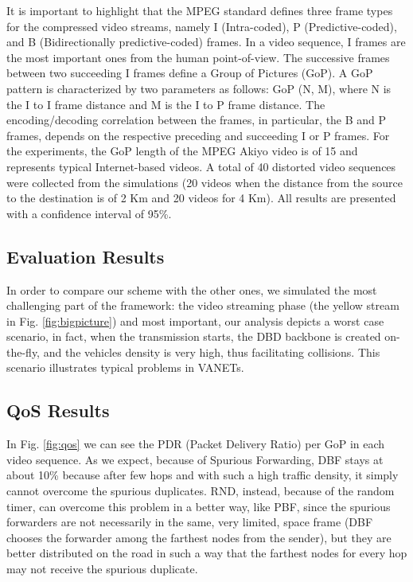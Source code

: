 \documentclass{sig-alternate-2013}
\begin{document}
It is important to highlight that the MPEG standard defines three frame types for the compressed video streams, namely I (Intra-coded), P (Predictive-coded), and B (Bidirectionally predictive-coded) frames. In a video sequence, I frames are the most important ones from the human point-of-view. The successive frames between two succeeding I frames define a Group of Pictures (GoP). A GoP pattern is characterized by two parameters as follows: GoP (N, M), where N is the I to I frame distance and M is the I to P frame distance. The encoding/decoding correlation between the frames, in particular, the B and P frames, depends on the respective preceding and succeeding I or P frames. For the experiments, the GoP length of the MPEG Akiyo video is of 15 and represents typical Internet-based videos. A total of 40 distorted video sequences were collected from the simulations (20 videos when the distance from the source to the destination is of 2 Km and 20 videos for 4 Km). All results are presented with a confidence interval of 95\%.




\subsection{Evaluation Results}
\label{Evaluation Results}
In order to compare our scheme with the other ones, we simulated the most challenging part of the framework: the video streaming phase (the yellow stream in Fig. \ref{fig:bigpicture}) and most important, our analysis depicts a worst case scenario, in fact, when the transmission starts, the DBD backbone is created on-the-fly, and the vehicles density is very high, thus facilitating collisions. This scenario illustrates typical problems in VANETs.




\subsection{QoS Results}
\label{QoSResults}

In Fig. \ref{fig:qos} we can see the PDR (Packet Delivery Ratio) per GoP in each video sequence. As we expect, because of Spurious Forwarding, DBF stays at about 10\% because after few hops and with such a high traffic density, it simply cannot overcome the spurious duplicates. RND, instead, because of the random timer, can overcome this problem in a better way, like PBF, since the spurious forwarders are not necessarily in the same, very limited, space frame (DBF chooses the forwarder among the farthest nodes from the sender), but they are better distributed on the road in such a way that the farthest nodes for every hop may not receive the spurious duplicate.
\end{document}
